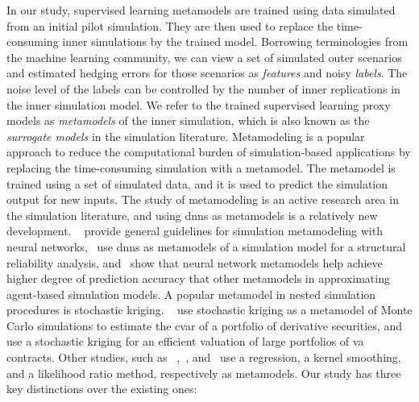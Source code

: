 In our study, supervised learning metamodels are trained using data simulated from an initial pilot simulation.
They are then used to replace the time-consuming inner simulations by the trained model.
Borrowing terminologies from the machine learning community, we can view a set of simulated outer scenarios and estimated hedging errors for those scenarios as \textit{features} and noisy \textit{labels}.
The noise level of the labels can be controlled by the number of inner replications in the inner simulation model.
We refer to the trained supervised learning proxy models as \textit{metamodels} of the inner simulation, which is also known as the \textit{surrogate models} in the simulation literature.
Metamodeling is a popular approach to reduce the computational burden of simulation-based applications by replacing the time-consuming simulation with a metamodel.
The metamodel is trained using a set of simulated data, and it is used to predict the simulation output for new inputs.
The study of metamodeling is an active research area in the simulation literature, and using \gls{dnn}s as metamodels is a relatively new development.
~\cite{fonseca2003simulation} provide general guidelines for simulation metamodeling with neural networks,~\cite{lieu2022adaptive} use \gls{dnn}s as metamodels of a simulation model for a structural reliability analysis, and~\cite{salle2014efficient} show that neural network metamodels help achieve higher degree of prediction accuracy that other metamodels in approximating agent-based simulation models.
A popular metamodel in nested simulation procedures is stochastic kriging.
~\cite{liu2010stochastic} use stochastic kriging as a metamodel of Monte Carlo simulations to estimate the \gls{cvar} of a portfolio of derivative securities, and~\cite{gan2015valuation} use a stochastic kriging for an efficient valuation of large portfolios of \gls{va} contracts.
Other studies, such as ~\cite{broadie2015risk},~\cite{hong2017kernel}, and~\cite{zhang2022sample} use a regression, a kernel smoothing, and a likelihood ratio method, respectively as metamodels.
Our study has three key distinctions over the existing ones:
